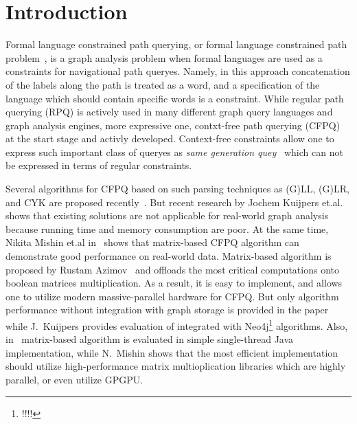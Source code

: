 \section{Introduction}

Formal language constrained path querying, or formal language constrained path problem~\cite{FLCpathProblem}, is a graph analysis problem when formal languages are used as a constraints for navigational path queryes.
Namely, in this approach concatenation of the labels along the path is treated as a word, and a specification of the language which should contain specific words is a constraint.
While regular path querying (RPQ) is actively used in many different graph query languages and graph analysis engines, more expressive one, contxt-free path querying (CFPQ)~\cite{Yannakakis} at the start stage and activly developed.
Context-free constraints allow one to express such important class of queryes as \textit{same generation quey}~\cite{FndDB} which can not be expressed in terms of regular constraints. 



Several algorithms for CFPQ based on such parsing techniques as (G)LL, (G)LR, and CYK are proposed recently~\cite{bradford2007quickest,ward2008distributed,bradford2016fast,hellingsPathQuerying,Grigorev:2017:CPQ:3166094.3166104,Verbitskaia:2018:PCC:3241653.3241655,RDF,10.1007/978-3-319-91662-0_17,Medeiros:2018:EEC:3167132.3167265}.
But recent research by Jochem Kuijpers et.al.~\cite{Kuijpers:2019:ESC:3335783.3335791} shows that existing solutions are not applicable for real-world graph analysis because running time and memory consumption are poor.
At the same time, Nikita Mishin et.al in~\cite{Mishin:2019:ECP:3327964.3328503} shows that matrix-based CFPQ algorithm can demonstrate good performance on real-world data.
Matrix-based algorithm is proposed by Rustam Azimov~\cite{Azimov:2018:CPQ:3210259.3210264} and offloads the most critical computations onto boolean matrices multiplication.
As a result, it is easy to implement, and allows one to utilize modern massive-parallel hardware for CFPQ.
But only algorithm performance without integration with graph storage is provided in the paper while J.~Kuijpers provides evaluation of integrated with Neo4j\footnote{!!!!} algorithms.
Also, in~\cite{Kuijpers:2019:ESC:3335783.3335791} matrix-based algorithm is evaluated in simple single-thread Java implementation, while N.~Mishin shows that the most efficient implementation should utilize high-performance matrix multioplication libraries which are highly parallel, or even utilize GPGPU.


